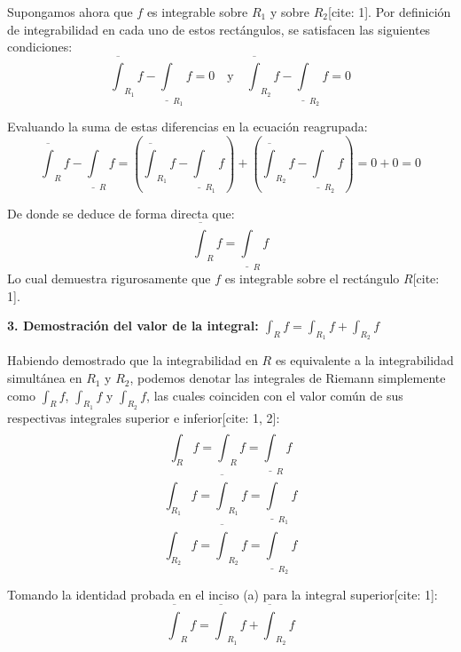 \documentclass[11pt,letterpaper]{article}
\begin{document}
Supongamos ahora que $f$ es integrable sobre $R_{1}$ y sobre $R_{2}$[cite: 1]. Por definición de integrabilidad en cada uno de estos rectángulos, se satisfacen las siguientes condiciones:
\begin{equation*}
\overline{\int}_{R_{1}}f - \underline{\int}_{R_{1}}f = 0 \quad \text{y} \quad \overline{\int}_{R_{2}}f - \underline{\int}_{R_{2}}f = 0
\end{equation*}

Evaluando la suma de estas diferencias en la ecuación reagrupada:
\begin{equation*}
\overline{\int}_{R}f - \underline{\int}_{R}f = \left(\overline{\int}_{R_{1}}f - \underline{\int}_{R_{1}}f\right) + \left(\overline{\int}_{R_{2}}f - \underline{\int}_{R_{2}}f\right) = 0 + 0 = 0
\end{equation*}

De donde se deduce de forma directa que:
\begin{equation*}
\overline{\int}_{R}f = \underline{\int}_{R}f
\end{equation*}
Lo cual demuestra rigurosamente que $f$ es integrable sobre el rectángulo $R$[cite: 1].

\vspace{0.5cm}
\textbf{3. Demostración del valor de la integral: $\int_{R}f = \int_{R_{1}}f + \int_{R_{2}}f$}

Habiendo demostrado que la integrabilidad en $R$ es equivalente a la integrabilidad simultánea en $R_{1}$ y $R_{2}$, podemos denotar las integrales de Riemann simplemente como $\int_{R}f$, $\int_{R_{1}}f$ y $\int_{R_{2}}f$, las cuales coinciden con el valor común de sus respectivas integrales superior e inferior[cite: 1, 2]:
\begin{equation*}
\int_{R}f = \overline{\int}_{R}f = \underline{\int}_{R}f
\end{equation*}
\begin{equation*}
\int_{R_{1}}f = \overline{\int}_{R_{1}}f = \underline{\int}_{R_{1}}f
\end{equation*}
\begin{equation*}
\int_{R_{2}}f = \overline{\int}_{R_{2}}f = \underline{\int}_{R_{2}}f
\end{equation*}

Tomando la identidad probada en el inciso (a) para la integral superior[cite: 1]:
\begin{equation*}
\overline{\int}_{R}f = \overline{\int}_{R_{1}}f + \overline{\int}_{R_{2}}f
\end{equation*}
\end{document}
